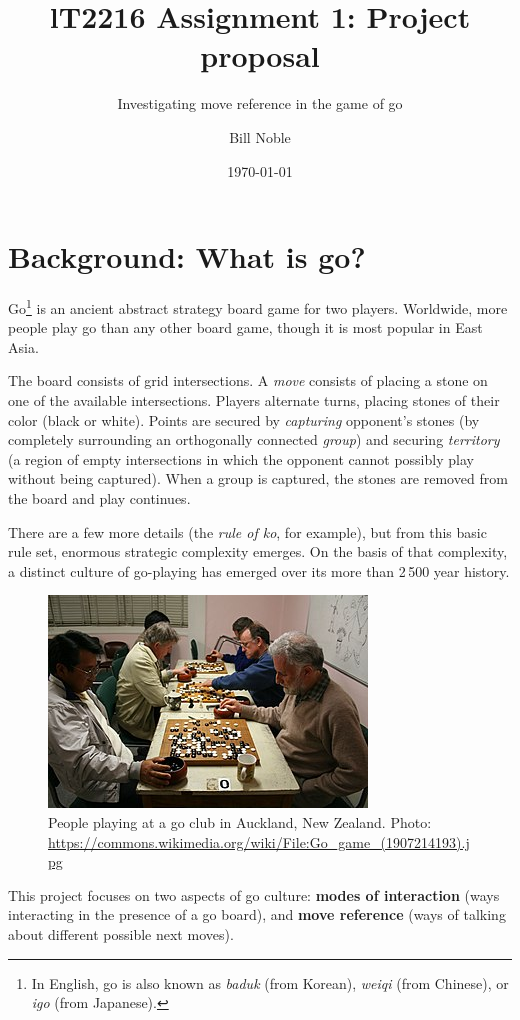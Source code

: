 \documentclass{scrartcl}
\title{lT2216 Assignment 1: Project proposal}
\subtitle{Investigating move reference in the game of go}
\author{Bill Noble}
\date{\today}
\begin{document}
\maketitle

\section{Background: What is go?}\label{background}

Go\footnote{%
In English, go is also known as 
\emph{baduk} (from Korean),
\emph{weiqi} (from Chinese), or
\emph{igo} (from Japanese).
}%
is an ancient abstract strategy board game for two players.
Worldwide, more people play go than any other board game,
though it is most popular in East Asia.

The board consists of grid intersections. 
A \emph{move} consists of placing a stone on one of the available
intersections.
Players alternate turns, placing stones of their color (black or white).
Points are secured by \emph{capturing}
opponent's stones (by completely surrounding an orthogonally connected \emph{group})
and securing \emph{territory} (a region of empty intersections in which
the opponent cannot possibly play without being captured).
When a group is captured,
the stones are removed from the board and play continues.

There are a few more details (the \emph{rule of ko}, for example),
but from this basic rule set, 
enormous strategic complexity emerges.
On the basis of that complexity, 
a distinct culture of go-playing 
has emerged over its more than 2\,500 year history. 

\begin{figure}[h]
  \centering
  \includegraphics[width=0.6\linewidth]{320px-Go_game_(1907214193).jpg}
  \caption{People playing at a go club in Auckland, New Zealand. Photo: \url{https://commons.wikimedia.org/wiki/File:Go_game_(1907214193).jpg}}
\end{figure}

This project focuses on two aspects of go culture:
\textbf{modes of interaction} 
(ways interacting in the presence of a go board), and
\textbf{move reference}
(ways of talking about different possible next moves).
\end{document}
